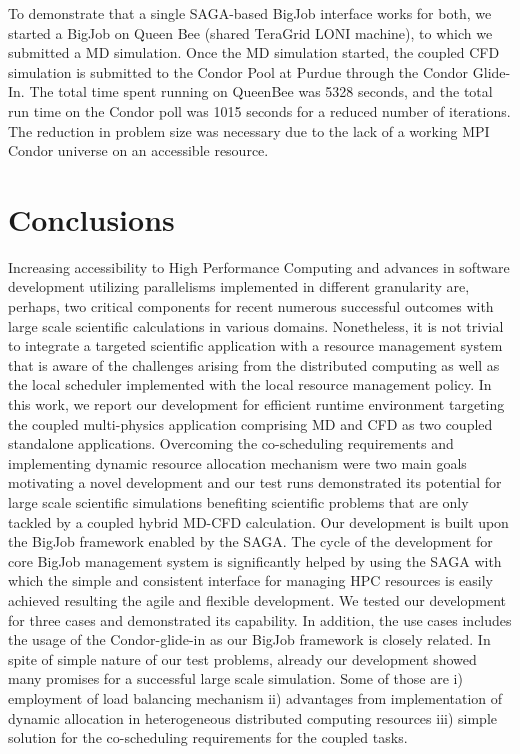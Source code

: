 \documentclass[conference,final]{IEEEtran}
\begin{document}
To demonstrate that a single SAGA-based BigJob interface works for
both, we started a BigJob on Queen Bee (shared TeraGrid LONI machine),
to which we submitted a MD simulation. Once the MD simulation started,
the coupled CFD simulation is submitted to the Condor Pool at Purdue
through the Condor Glide-In. The total time spent running on QueenBee
was 5328 seconds, and the total run time on the Condor poll was 1015
seconds for a reduced number of iterations. The reduction in problem
size was necessary due to the lack of a working MPI Condor universe on
an accessible resource.

\section{Conclusions}
Increasing accessibility to High Performance Computing and advances in
software development utilizing parallelisms implemented in different
granularity are, perhaps, two critical components for recent numerous
successful outcomes with large scale scientific calculations in
various domains. Nonetheless, it is not trivial to integrate a
targeted scientific application with a resource management system that
is aware of the challenges arising from the distributed computing as
well as the local scheduler implemented with the local resource
management policy. In this work, we report our development for
efficient runtime environment targeting the coupled multi-physics
application comprising MD and CFD as two coupled standalone
applications. Overcoming the co-scheduling requirements and
implementing dynamic resource allocation mechanism were two main goals
motivating a novel development and our test runs demonstrated its
potential for large scale scientific simulations benefiting scientific
problems that are only tackled by a coupled hybrid MD-CFD calculation.
Our development is built upon the BigJob framework enabled by the
SAGA. The cycle of the development for core BigJob management system
is significantly helped by using the SAGA with which the simple and
consistent interface for managing HPC resources is easily achieved
resulting the agile and flexible development. We tested our
development for three cases and demonstrated its capability. In
addition, the use cases includes the usage of the Condor-glide-in as
our BigJob framework is closely related. In spite of simple nature of
our test problems, already our development showed many promises for a
successful large scale simulation. Some of those are i) employment of
load balancing mechanism ii) advantages from implementation of dynamic
allocation in heterogeneous distributed computing resources iii)
simple solution for the co-scheduling requirements for the coupled
tasks.
\end{document}

